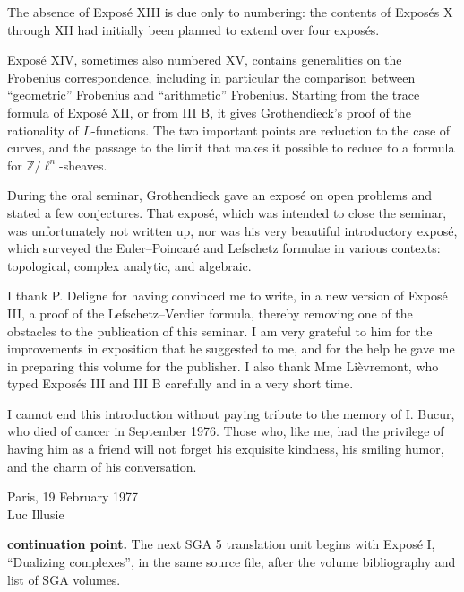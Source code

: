 \documentclass[11pt]{article}
\newcommand{\Z}{\mathbb{Z}}
\begin{document}
The absence of Exposé XIII is due only to numbering: the contents of Exposés X through XII had initially been planned to extend over four exposés.

Exposé XIV, sometimes also numbered XV, contains generalities on the Frobenius correspondence, including in particular the comparison between ``geometric'' Frobenius and ``arithmetic'' Frobenius. Starting from the trace formula of Exposé XII, or from III B, it gives Grothendieck's proof of the rationality of $L$-functions. The two important points are reduction to the case of curves, and the passage to the limit that makes it possible to reduce to a formula for $\Z/\ell^n$-sheaves.

During the oral seminar, Grothendieck gave an exposé on open problems and stated a few conjectures. That exposé, which was intended to close the seminar, was unfortunately not written up, nor was his very beautiful introductory exposé, which surveyed the Euler--Poincaré and Lefschetz formulae in various contexts: topological, complex analytic, and algebraic.

I thank P. Deligne for having convinced me to write, in a new version of Exposé III, a proof of the Lefschetz--Verdier formula, thereby removing one of the obstacles to the publication of this seminar. I am very grateful to him for the improvements in exposition that he suggested to me, and for the help he gave me in preparing this volume for the publisher. I also thank Mme Lièvremont, who typed Exposés III and III B carefully and in a very short time.

I cannot end this introduction without paying tribute to the memory of I. Bucur, who died of cancer in September 1976. Those who, like me, had the privilege of having him as a friend will not forget his exquisite kindness, his smiling humor, and the charm of his conversation.

\begin{flushright}
Paris, 19 February 1977\\
Luc Illusie
\end{flushright}

\bigskip
\noindent\textbf{continuation point.} The next SGA 5 translation unit begins with Exposé I, ``Dualizing complexes'', in the same source file, after the volume bibliography and list of SGA volumes.
\end{document}
